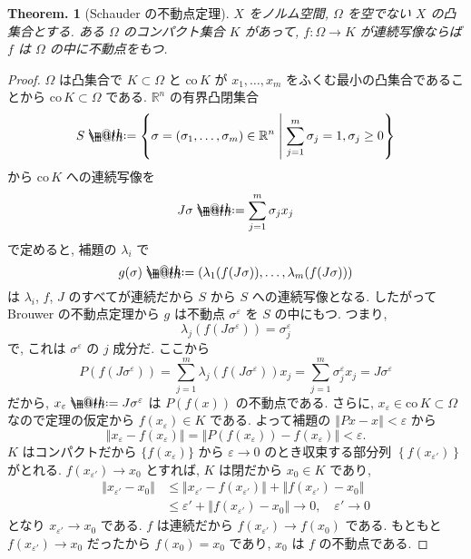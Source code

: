 \documentclass[openany, a4paper, oneside]{jsbook}
\makeatletter
\newcommand*{\defeq}{\mathrel{\rlap{%
\raisebox{0.3ex}{$\m@th\cdot$}}%
\raisebox{-0.3ex}{$\m@th\cdot$}}%
=}
\newcommand{\co}{\mathrm{co}\,}
\theoremstyle{break}
\newtheorem{thm}{Theorem.}[section]
\theoremstyle{breakdefn}
\newcommand{\norm}[1]{\left\Vert#1\right\Vert}
\newcommand{\rbk}[1]{\left (#1\right)}
\newcommand{\cbk}[1]{\left\{#1\right\}}
\newcommand{\relmiddle}[1]{\mathrel{}\middle#1\mathrel{}}
\newcommand{\set}[2]{\left\{#1 \relmiddle| #2\right\}}
\newcommand{\bbRn}{\mathbb{R}^n}
\makeatother
\begin{document}
\begin{thm}[Schauder の不動点定理]
 $X$ をノルム空間, $\Omega$ を空でない $X$ の凸集合とする.
 ある $\Omega$ のコンパクト集合 $K$ があって,  $f \colon \Omega \to K$ が連続写像ならば $f$ は $\Omega$ の中に不動点をもつ.
\end{thm}
\begin{proof}
$\Omega$ は凸集合で $K \subset \Omega$ と $\co K$ が $x_1, \dots , x_m$
をふくむ最小の凸集合であることから $\co K \subset \Omega$ である.
$\bbRn$ の有界凸閉集合
\begin{align}
 S
 \defeq
 \set{\sigma = (\sigma_1, \dots , \sigma_m) \in \bbRn}{\sum_{j=1}^m \sigma_j = 1, \sigma_j \ge 0}
\end{align}
から $\co K$ への連続写像を
\begin{equation}
 J \sigma
 \defeq
 \sum_{j=1}^m \sigma_j x_j
\end{equation}
で定めると, 補題の $\lambda_i$ で
\begin{equation}
 g (\sigma)
 \defeq
 \rbk{\lambda_1 (f (J\sigma)), \dots , \lambda_m (f (J\sigma))}
\end{equation}
は $\lambda_i$, $f$,  $J$ のすべてが連続だから $S$ から $S$ への連続写像となる.
したがって Brouwer の不動点定理から $g$ は不動点 $\sigma^\varepsilon$ を $S$ の中にもつ.
つまり,
\begin{equation}
 \lambda_j (f (J\sigma^\varepsilon))
 =
 \sigma_j^\varepsilon
\end{equation}
で, これは $\sigma^\varepsilon$ の $j$ 成分だ.
ここから
\begin{equation}
 P (f (J\sigma^{\varepsilon}))
 =
 \sum_{j=1}^m \lambda_j (f (J\sigma^{\varepsilon})) x_j
 =
 \sum_{j=1}^m \sigma_j^{\varepsilon} x_j
 =
 J\sigma^{\varepsilon}
\end{equation}
だから, $x_\varepsilon \defeq J \sigma^\varepsilon$ は $P(f(x))$ の不動点である.
さらに, $x_\varepsilon \in \co K \subset \Omega$ なので定理の仮定から
$f (x_\varepsilon) \in K$ である.
よって補題の $\norm{Px - x} < \varepsilon$ から
\begin{equation}
 \norm{x_{\varepsilon} - f (x_{\varepsilon})}
 =
 \norm{P (f (x_\varepsilon)) - f (x_\varepsilon)}
 <
 \varepsilon.
\end{equation}
$K$ はコンパクトだから $\{f (x_\varepsilon)\}$ から $\varepsilon \to 0$ のとき収束する部分列
$\cbk{f (x_{\varepsilon'})}$ がとれる.
$f (x_{\varepsilon'}) \to x_0$ とすれば, $K$ は閉だから $x_0 \in K$ であり,
\begin{align}
 \norm{x_{\varepsilon'} - x_0}
 &\le
 \norm{x_{\varepsilon'} - f (x_{\varepsilon'})}
  +\norm{f (x_{\varepsilon'}) - x_0}   \\
 &\le
 \varepsilon' + \norm{f(x_{\varepsilon'}) - x_0}
 \to 0, \quad \varepsilon' \to 0
\end{align}
となり $x_{\varepsilon'} \to x_0$ である.
$f$ は連続だから $f (x_{\varepsilon'}) \to f (x_0)$ である.
もともと $f (x_{\varepsilon'}) \to x_0$ だったから $f (x_0) = x_0$ であり, $x_0$ は $f$ の不動点である.
\end{proof}
\end{document}
